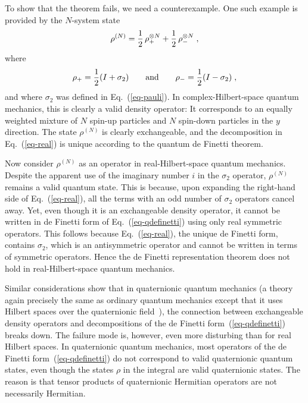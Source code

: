 To show that the theorem fails, we need a counterexample. One such
example is provided by the $N$-system state
\begin{equation}
\rho^{(N)}={1\over2}\,\rho_+^{\otimes N} + {1\over2}\,\rho_-^{\otimes N} \;,
\label{eq-real}
\end{equation}
where
\begin{equation}
\rho_+={1\over2}(I+\sigma_2)\qquad\mbox{and}
\qquad\rho_-={1\over2}(I-\sigma_2)\;,
\end{equation}
and where $\sigma_2$ was defined in Eq.~(\ref{eq-pauli}).
In complex-Hilbert-space quantum mechanics, this is clearly a
valid density operator: It corresponds to an equally weighted
mixture of $N$ spin-up particles and $N$ spin-down particles in
the $y$ direction.  The state $\rho^{(N)}$ is clearly
exchangeable, and the decomposition in Eq.~(\ref{eq-real}) is
unique according to the quantum de Finetti theorem.

Now consider $\rho^{(N)}$ as an operator in real-Hilbert-space
quantum mechanics.  Despite the apparent use of the imaginary number
$i$ in the $\sigma_2$ operator, $\rho^{(N)}$ remains a valid quantum
state.  This is because, upon expanding the right-hand side of
Eq.~(\ref{eq-real}), all the terms with an odd number of $\sigma_2$
operators cancel away.  Yet, even though it is an exchangeable
density operator, it cannot be written in de Finetti form of
Eq.~(\ref{eq-qdefinetti}) using only real symmetric operators. This
follows because Eq.~(\ref{eq-real}), the unique de Finetti form,
contains $\sigma_2$, which is an antisymmetric operator and cannot
be written in terms of symmetric operators.  Hence the de Finetti
representation theorem does not hold in real-Hilbert-space quantum
mechanics.

Similar considerations show that in quaternionic quantum mechanics
(a theory again precisely the same as ordinary quantum mechanics
except that it uses Hilbert spaces over the quaternionic
field~\cite{Adler1995}), the connection between exchangeable density
operators and decompositions of the de Finetti
form~(\ref{eq-qdefinetti}) breaks down.  The failure mode is,
however, even more disturbing than for real Hilbert spaces. In
quaternionic quantum mechanics, most operators of the de Finetti
form~(\ref{eq-qdefinetti}) do not correspond to valid quaternionic
quantum states, even though the states $\rho$ in the integral are
valid quaternionic states.  The reason is that tensor products of
quaternionic Hermitian operators are not necessarily Hermitian.

